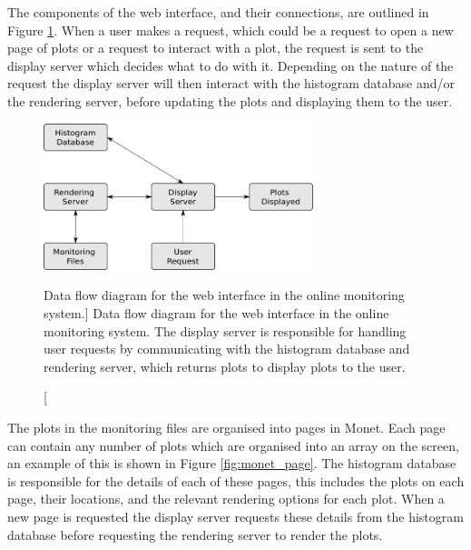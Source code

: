 The components of the web interface, and their connections, are outlined in 
Figure \ref{fig:monet_flow}. When a user makes a request, which could be a
request to open a new page of plots or a request to interact with a plot, the 
request is sent to the display server which decides what to do with it.
Depending on the nature of the request the display server will then interact
with the histogram database and/or the rendering server, before updating the
plots and displaying them to the user. 

\begin{figure}

	\centering

	\includegraphics[width=0.7\textwidth]{figures/monet_flow.png}

	\caption
	[Data flow diagram for the web interface in the \protodune{} online 
	monitoring system.] 
	{ Data flow diagram for the web interface in the \protodune{} online 
	monitoring system. The display server is responsible for handling user
	requests by communicating with the histogram database and rendering server,
	which returns plots to display plots to the user.} 
	\label{fig:monet_flow}

\end{figure}

The plots in the monitoring files are organised into pages in Monet. Each page
can contain any number of plots which are organised into an array on the screen,
an example of this is shown in Figure \ref{fig:monet_page}. The histogram 
database is responsible for the details of each of these pages, this includes
the plots on each page, their locations, and the relevant rendering options for
each plot. When a new page is requested the display server requests these
details from the histogram database before requesting the rendering server to 
render the plots.

